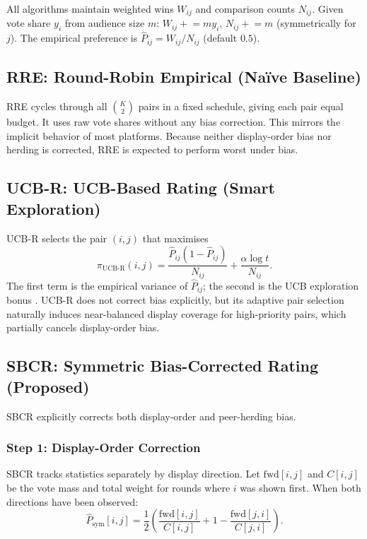 \documentclass[12pt,a4paper]{article}
\begin{document}
All algorithms maintain weighted wins $W_{ij}$ and comparison counts $N_{ij}$.
Given vote share $y_i$ from audience size $m$:
$W_{ij} \mathrel{+}= m y_i$, $N_{ij} \mathrel{+}= m$ (symmetrically for $j$).
The empirical preference is $\hat{P}_{ij} = W_{ij}/N_{ij}$ (default $0.5$).

\subsection{RRE: Round-Robin Empirical (Na{\"i}ve Baseline)}

RRE cycles through all $\binom{K}{2}$ pairs in a fixed schedule, giving each pair
equal budget.  It uses raw vote shares without any bias correction.  This mirrors
the implicit behavior of most platforms.  Because neither display-order bias nor
herding is corrected, RRE is expected to perform worst under bias.

\subsection{UCB-R: UCB-Based Rating (Smart Exploration)}

UCB-R selects the pair $(i, j)$ that maximises
\begin{equation}\label{eq:ucbr}
  \pi_{\text{UCB-R}}(i,j)
    = \frac{\hat{P}_{ij}(1-\hat{P}_{ij})}{N_{ij}}
    + \frac{\alpha \log t}{N_{ij}}.
\end{equation}
The first term is the empirical variance of $\hat{P}_{ij}$; the second is the
UCB exploration bonus \cite{auer2002finite}.  UCB-R does not correct bias
explicitly, but its adaptive pair selection naturally induces near-balanced
display coverage for high-priority pairs, which partially cancels display-order
bias.

\subsection{SBCR: Symmetric Bias-Corrected Rating (Proposed)}

SBCR explicitly corrects both display-order and peer-herding bias.

\subsubsection{Step 1: Display-Order Correction}

SBCR tracks statistics separately by display direction.  Let
$\text{fwd}[i,j]$ and $C[i,j]$ be the vote mass and total weight for rounds
where $i$ was shown first.  When both directions have been observed:
\begin{equation}\label{eq:sym}
  \hat{P}_{\text{sym}}[i,j]
    = \frac{1}{2}\!\left(
        \frac{\text{fwd}[i,j]}{C[i,j]}
        + 1 - \frac{\text{fwd}[j,i]}{C[j,i]}
      \right).
\end{equation}
\end{document}
